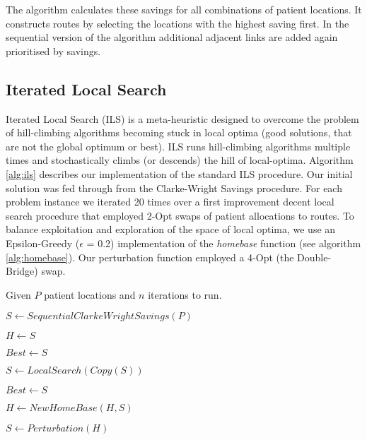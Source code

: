 \begin{appendices}
The algorithm calculates these savings for all combinations of patient locations.  It constructs routes by selecting the locations with the highest saving first.  In the sequential version of the algorithm additional adjacent links are added again prioritised  by savings.

\subsection{Iterated Local Search}

Iterated Local Search (ILS) is a meta-heuristic designed to overcome the problem of hill-climbing algorithms becoming stuck in local optima (good solutions, that are not the global optimum or best). ILS runs hill-climbing algorithms multiple times and stochastically climbs (or descends) the hill of local-optima.  Algorithm \ref{alg:ils} describes our implementation of the standard ILS procedure. Our initial solution was fed through from the Clarke-Wright Savings procedure. For each problem instance we iterated 20 times over a first improvement decent local search procedure that employed 2-Opt swaps of patient allocations to routes. To balance exploitation and exploration of the space of local optima, we use an Epsilon-Greedy ($\epsilon$ = 0.2) implementation of the \textit{homebase} function (see algorithm \ref{alg:homebase}). Our perturbation function employed a 4-Opt (the Double-Bridge) swap.

    \begin{algorithm}[H]
    \DontPrintSemicolon
      
      Given $P$ patient locations and $n$ iterations to run.
      
          $S \leftarrow SequentialClarkeWrightSavings(P)$ 
          
          $H \leftarrow S$
          
          $Best \leftarrow S$
          
            {
                $S \leftarrow LocalSearch(Copy(S))$
                
                {
                    $Best \leftarrow S$
                }    
                
                    
                $H \leftarrow NewHomeBase(H, S)$
                
                $S \leftarrow Perturbation(H)$
            }
          
     

\end{algorithm}
\end{appendices}
